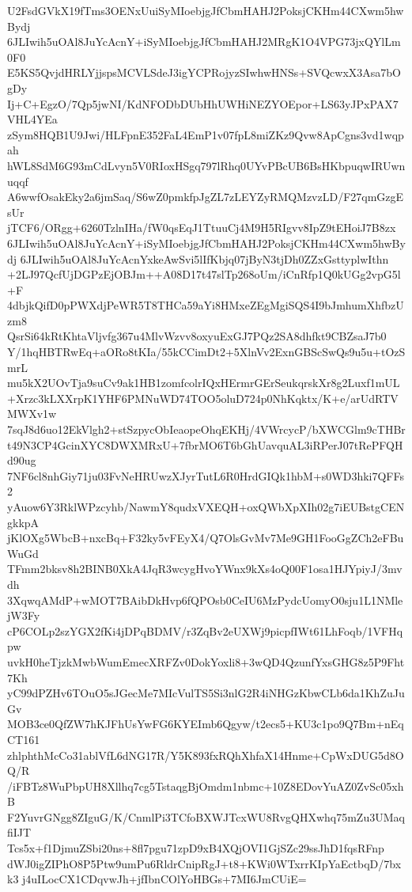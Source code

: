 U2FsdGVkX19fTms3OENxUuiSyMIoebjgJfCbmHAHJ2PoksjCKHm44CXwm5hwBydj
6JLIwih5uOAl8JuYcAcnY+iSyMIoebjgJfCbmHAHJ2MRgK1O4VPG73jxQYlLm0F0
E5KS5QvjdHRLYjjspsMCVLSdeJ3igYCPRojyzSIwhwHNSs+SVQcwxX3Asa7bOgDy
Ij+C+EgzO/7Qp5jwNI/KdNFODbDUbHhUWHiNEZYOEpor+LS63yJPxPAX7VHL4YEa
zSym8HQB1U9Jwi/HLFpnE352FaL4EmP1v07fpL8miZKz9Qvw8ApCgns3vd1wqpah
hWL8SdM6G93mCdLvyn5V0RIoxHSgq797lRhq0UYvPBcUB6BsHKbpuqwIRUwnuqqf
A6wwfOsakEky2a6jmSaq/S6wZ0pmkfpJgZL7zLEYZyRMQMzvzLD/F27qmGzgEsUr
jTCF6/ORgg+6260TzlnIHa/fW0qsEqJ1TtuuCj4M9H5RIgvv8IpZ9tEHoiJ7B8zx
6JLIwih5uOAl8JuYcAcnY+iSyMIoebjgJfCbmHAHJ2PoksjCKHm44CXwm5hwBydj
6JLIwih5uOAl8JuYcAcnYxkeAwSvi5lIfKbjq07jByN3tjDh0ZZxGsttyplwIthn
+2LJ97QcfUjDGPzEjOBJm++A08D17t47slTp268oUm/iCnRfp1Q0kUGg2vpG5l+F
4dbjkQifD0pPWXdjPeWR5T8THCa59aYi8HMxeZEgMgiSQS4I9bJmhumXhfbzUzm8
QsrSi64kRtKhtaVljvfg367u4MlvWzvv8oxyuExGJ7PQz2SA8dhfkt9CBZsaJ7b0
Y/1hqHBTRwEq+aORo8tKIa/55kCCimDt2+5XlnVv2ExnGBScSwQs9u5u+tOzSmrL
mu5kX2UOvTja9suCv9ak1HB1zomfcolrIQxHErmrGErSeukqrskXr8g2Luxf1mUL
+Xrzc3kLXXrpK1YHF6PMNuWD74TOO5oluD724p0NhKqktx/K+e/arUdRTVMWXv1w
7sqJ8d6uo12EkVlgh2+stSzpycObIeaopeOhqEKHj/4VWrcycP/bXWCGlm9cTHBr
t49N3CP4GcinXYC8DWXMRxU+7fbrMO6T6bGhUavquAL3iRPerJ07tRePFQHd90ug
7NF6cl8nhGiy71ju03FvNeHRUwzXJyrTutL6R0HrdGIQk1hbM+s0WD3hki7QFFs2
yAuow6Y3RklWPzcyhb/NawmY8qudxVXEQH+oxQWbXpXIh02g7iEUBstgCENgkkpA
jKlOXg5WbcB+nxcBq+F32ky5vFEyX4/Q7OlsGvMv7Me9GH1FooGgZCh2eFBuWuGd
TFmm2bksv8h2BINB0XkA4JqR3wcygHvoYWnx9kXs4oQ00F1osa1HJYpiyJ/3mvdh
3XqwqAMdP+wMOT7BAibDkHvp6fQPOsb0CeIU6MzPydcUomyO0sju1L1NMlejW3Fy
cP6COLp2szYGX2fKi4jDPqBDMV/r3ZqBv2eUXWj9picpfIWt61LhFoqb/1VFHqpw
uvkH0heTjzkMwbWumEmecXRFZv0DokYoxli8+3wQD4QzunfYxsGHG8z5P9Fht7Kh
yC99dPZHv6TOuO5sJGecMe7MIcVulTS5Si3nlG2R4iNHGzKbwCLb6da1KhZuJuGv
MOB3ce0QfZW7hKJFhUsYwFG6KYEImb6Qgyw/t2ecs5+KU3c1po9Q7Bm+nEqCT161
zhlphthMcCo31ablVfL6dNG17R/Y5K893fxRQhXhfaX14Hnme+CpWxDUG5d8OQ/R
/iFBTz8WuPbpUH8Xllhq7cg5TstaqgBjOmdm1nbmc+10Z8EDovYuAZ0ZvSc05xhB
F2YuvrGNgg8ZIguG/K/CnmlPi3TCfoBXWJTcxWU8RvgQHXwhq75mZu3UMaqfiIJT
Tcs5x+f1DjmuZSbi20ns+8fl7pgu71zpD9xB4XQjOVI1GjSZc29ssJhD1fqsRFnp
dWJ0igZIPhO8P5Ptw9umPu6RldrCnipRgJ+t8+KWi0WTxrrKIpYaEctbqD/7bxk3
j4uILocCX1CDqvwJh+jfIbnCOlYoHBGs+7MI6JmCUiE=
